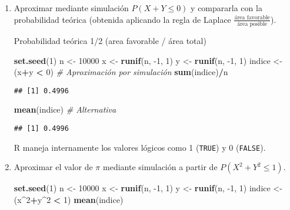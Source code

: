 \documentclass[
]{book}
\newenvironment{Shaded}{\begin{snugshade}}{\end{snugshade}}
\newcommand{\CommentTok}[1]{\textcolor[rgb]{0.56,0.35,0.01}{\textit{#1}}}
\newcommand{\DecValTok}[1]{\textcolor[rgb]{0.00,0.00,0.81}{#1}}
\newcommand{\KeywordTok}[1]{\textcolor[rgb]{0.13,0.29,0.53}{\textbf{#1}}}
\newcommand{\NormalTok}[1]{#1}
\newcommand{\OperatorTok}[1]{\textcolor[rgb]{0.81,0.36,0.00}{\textbf{#1}}}
\newcommand{\StringTok}[1]{\textcolor[rgb]{0.31,0.60,0.02}{#1}}
\theoremstyle{break}
\theoremstyle{definition}
\theoremstyle{definition}
\theoremstyle{definition}
\theoremstyle{remark}
\let\BeginKnitrBlock\begin \let\EndKnitrBlock\end
\begin{document}
\begin{enumerate}
\def\labelenumi{\alph{enumi})}
\item
  Aproximar mediante simulación \(P\left(X + Y \leq 0 \right)\) y
  compararla con la probabilidad teórica (obtenida aplicando la
  regla de Laplace \(\frac{\text{área favorable}}{\text{área posible}}\)).

  Probabilidad teórica 1/2 (area favorable / área total)

\begin{Shaded}
\begin{Highlighting}[]
\KeywordTok{set.seed}\NormalTok{(}\DecValTok{1}\NormalTok{)}
\NormalTok{n <-}\StringTok{ }\DecValTok{10000}
\NormalTok{x <-}\StringTok{ }\KeywordTok{runif}\NormalTok{(n, }\DecValTok{-1}\NormalTok{, }\DecValTok{1}\NormalTok{)}
\NormalTok{y <-}\StringTok{ }\KeywordTok{runif}\NormalTok{(n, }\DecValTok{-1}\NormalTok{, }\DecValTok{1}\NormalTok{)}
\NormalTok{indice <-}\StringTok{ }\NormalTok{(x}\OperatorTok{+}\NormalTok{y }\OperatorTok{<}\StringTok{ }\DecValTok{0}\NormalTok{)}
\CommentTok{# Aproximación por simulación}
\KeywordTok{sum}\NormalTok{(indice)}\OperatorTok{/}\NormalTok{n}
\end{Highlighting}
\end{Shaded}

\begin{verbatim}
## [1] 0.4996
\end{verbatim}

\begin{Shaded}
\begin{Highlighting}[]
\KeywordTok{mean}\NormalTok{(indice) }\CommentTok{# Alternativa }
\end{Highlighting}
\end{Shaded}

\begin{verbatim}
## [1] 0.4996
\end{verbatim}

  \BeginKnitrBlock{remark}

  \iffalse{} {Nota: } \fi{}R maneja internamente los valores lógicos como 1 (\texttt{TRUE}) y 0 (\texttt{FALSE}).

  \EndKnitrBlock{remark}
\item
  Aproximar el valor de \(\pi\) mediante simulación a partir de
  \(P\left( X^2 +Y^2 \leq 1 \right)\).

\begin{Shaded}
\begin{Highlighting}[]
\KeywordTok{set.seed}\NormalTok{(}\DecValTok{1}\NormalTok{)}
\NormalTok{n <-}\StringTok{ }\DecValTok{10000}
\NormalTok{x <-}\StringTok{ }\KeywordTok{runif}\NormalTok{(n, }\DecValTok{-1}\NormalTok{, }\DecValTok{1}\NormalTok{)}
\NormalTok{y <-}\StringTok{ }\KeywordTok{runif}\NormalTok{(n, }\DecValTok{-1}\NormalTok{, }\DecValTok{1}\NormalTok{)}
\NormalTok{indice <-}\StringTok{ }\NormalTok{(x}\OperatorTok{^}\DecValTok{2}\OperatorTok{+}\NormalTok{y}\OperatorTok{^}\DecValTok{2} \OperatorTok{<}\StringTok{ }\DecValTok{1}\NormalTok{)}
\KeywordTok{mean}\NormalTok{(indice)}
\end{Highlighting}
\end{Shaded}


\end{enumerate}
\end{document}
